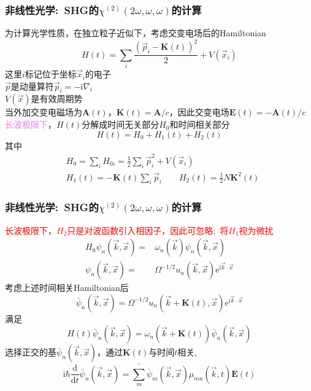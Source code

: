 \documentclass[cjk,slidestop,compress,mathserif,blue]{beamer}
\begin{document}
\frame
{
	\frametitle{非线性光学:~\textrm{SHG}的$\chi^{(2)}(2\omega,\omega,\omega)$的计算}
	为计算光学性质，在独立粒子近似下，考虑交变电场后的\textrm{Hamiltonian}
	\begin{displaymath}
		H(t)=\sum_i\frac{(\vec p_i-\mathbf{K}(t))^2}2+V(\vec x_i)
	\end{displaymath}
	这里$i$标记位于坐标$\vec x_i$的电子\\
	$\vec p$是动量算符$\vec p_i=-\mathrm{i}\nabla_i$\\
	$V(\vec x)$是有效周期势\\
	当外加交变电磁场为$\mathbf{A}(t)$，$\mathbf{K}(t)=\mathbf{A}/c$，因此交变电场$\mathbf{E}(t)=-\dot{\mathbf{A}}(t)/c$\\
	\textcolor{violet}{长波极限下}，$H(t)$分解成时间无关部分$H_0$和时间相关部分
	\begin{displaymath}
		H(t)=H_0+H_1(t)+H_2(t)
	\end{displaymath}
	其中\vspace{-12pt}
	\begin{displaymath}
		\begin{aligned}
			&H_0=\sum_iH_{0i}=\frac12\sum_i\vec p_i^2+V(\vec x_i)\\
			&H_1(t)=-\mathbf{K}(t)\sum_i\vec p_i\qquad H_2(t)=\frac12N\mathbf{K}^2(t)
		\end{aligned}
	\end{displaymath}
}

\frame
{
	\frametitle{非线性光学:~\textrm{SHG}的$\chi^{(2)}(2\omega,\omega,\omega)$的计算}
	\textcolor{red}{长波极限下，$H_2$只是对波函数引入相因子，因此可忽略;~将$H_1$视为微扰}
	\begin{displaymath}
		\begin{aligned}
			H_0\psi_n(\vec k,\vec x)=&\omega_n(\vec k)\psi_n(\vec k,\vec x)\\
			\psi_n(\vec k,\vec x)=&\Omega^{-1/2}u_n(\vec k,\vec x)\mathrm{e}^{\mathrm{i}\vec k\cdot\vec x}
		\end{aligned}
	\end{displaymath}
	考虑上述时间相关\textrm{Hamiltonian}后
	\begin{displaymath}
		\bar\psi_n(\vec k,\vec x)=\Omega^{-1/2}u_n(\vec k+\mathbf{K}(t),\vec x)\mathrm{e}^{\mathrm{i}\vec k\cdot\vec x}
	\end{displaymath}
	满足
	\begin{displaymath}
		H(t)\bar\psi_n(\vec k,\vec x)=\omega_n(\vec k+\mathbf{K}(t))\bar\psi_n(\vec k,\vec x)
	\end{displaymath}
	选择正交的基$\bar\psi_n(\vec k,\vec x)$，通过$\mathbf{K}(t)$与时间$t$相关,
	\begin{displaymath}
		\mathrm{i}\hbar\frac{\mathrm{d}}{\mathrm{d}t}\bar\psi_n(\vec k,\vec x)=\sum_m^{\prime}\bar\psi_m(\vec k,\vec x)\mu_{mn}(\vec k,t)\mathbf{E}(t)
	\end{displaymath}
}
	
\end{document}
